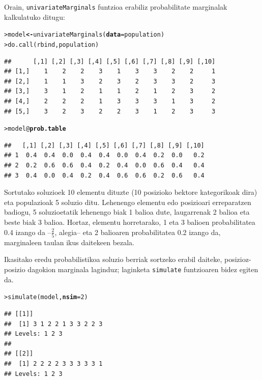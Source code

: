 \documentclass[eu]{ifirak}\usepackage[]{graphicx}\usepackage[]{color}
\makeatletter
\newcommand{\hlnum}[1]{\textcolor[rgb]{0.659,0.4,0.051}{#1}}%
\newcommand{\hlopt}[1]{\textcolor[rgb]{0,0,0}{#1}}%
\newcommand{\hlstd}[1]{\textcolor[rgb]{0,0,0}{#1}}%
\newcommand{\hlkwb}[1]{\textcolor[rgb]{0.549,0.114,0.412}{\textbf{#1}}}%
\newcommand{\hlkwc}[1]{\textcolor[rgb]{0.659,0.573,0.133}{\textbf{#1}}}%
\newcommand{\hlkwd}[1]{\textcolor[rgb]{0.659,0.133,0.482}{#1}}%
\newenvironment{kframe}{%
 \def\at@end@of@kframe{}%
 \ifinner\ifhmode%
  \def\at@end@of@kframe{\end{minipage}}%
  \begin{minipage}{\columnwidth}%
 \fi\fi%
 \def\FrameCommand##1{\hskip\@totalleftmargin \hskip-\fboxsep
 \colorbox{shadecolor}{##1}\hskip-\fboxsep
     \hskip-\linewidth \hskip-\@totalleftmargin \hskip\columnwidth}%
 \MakeFramed {\advance\hsize-\width
   \@totalleftmargin\z@ \linewidth\hsize
   \@setminipage}}%
 {\par\unskip\endMakeFramed%
 \at@end@of@kframe}
\newenvironment{knitrout}{}{} %
\newcommand{\code}[1]{\texttt{#1}}
\makeatother
\begin{document}
Orain, \code{univariateMarginals} funtzioa erabiliz probabilitate marginalak kalkulatuko ditugu:

\begin{knitrout}
\color{fgcolor}\begin{kframe}
\begin{alltt}
\hlstd{> }\hlstd{model} \hlkwb{<-} \hlkwd{univariateMarginals}\hlstd{(}\hlkwc{data}\hlstd{=population)}
\hlstd{> }\hlkwd{do.call}\hlstd{(rbind, population)}
\end{alltt}
\begin{verbatim}
##      [,1] [,2] [,3] [,4] [,5] [,6] [,7] [,8] [,9] [,10]
## [1,]    1    2    2    3    1    3    3    2    2     1
## [2,]    1    1    3    2    3    2    3    3    2     3
## [3,]    3    1    2    1    1    2    1    2    3     2
## [4,]    2    2    2    1    3    3    3    1    3     2
## [5,]    3    2    3    2    2    3    1    2    3     3
\end{verbatim}
\begin{alltt}
\hlstd{> }\hlstd{model}\hlopt{@}\hlkwc{prob.table}
\end{alltt}
\begin{verbatim}
##   [,1] [,2] [,3] [,4] [,5] [,6] [,7] [,8] [,9] [,10]
## 1  0.4  0.4  0.0  0.4  0.4  0.0  0.4  0.2  0.0   0.2
## 2  0.2  0.6  0.6  0.4  0.2  0.4  0.0  0.6  0.4   0.4
## 3  0.4  0.0  0.4  0.2  0.4  0.6  0.6  0.2  0.6   0.4
\end{verbatim}
\end{kframe}
\end{knitrout}

Sortutako soluzioek 10 elementu dituzte (10 posizioko bektore kategorikoak dira) eta populazioak 5 soluzio ditu. Lehenengo elementu edo posizioari erreparatzen badiogu, 5 soluzioetatik lehenengo biak 1 balioa dute, laugarrenak 2 balioa eta beste biak 3 balioa. Hortaz, elementu horretarako, 1 eta 3 balioen probabilitatea 0.4 izango da --$\frac{2}{5}$, alegia-- eta 2 balioaren probabilitatea 0.2 izango da, marginaleen taulan ikus daitekeen bezala.

Ikasitako eredu probabilistikoa soluzio berriak sortzeko erabil daiteke, posizioz-posizio dagokion marginala laginduz; laginketa \code{simulate} funtzioaren bidez egiten da.

\begin{knitrout}
\color{fgcolor}\begin{kframe}
\begin{alltt}
\hlstd{> }\hlkwd{simulate}\hlstd{(model,} \hlkwc{nsim}\hlstd{=}\hlnum{2}\hlstd{)}
\end{alltt}
\begin{verbatim}
## [[1]]
##  [1] 3 1 2 2 1 3 3 2 2 3
## Levels: 1 2 3
## 
## [[2]]
##  [1] 2 2 2 2 3 3 3 3 3 1
## Levels: 1 2 3
\end{verbatim}
\end{kframe}
\end{knitrout}
\end{document}
